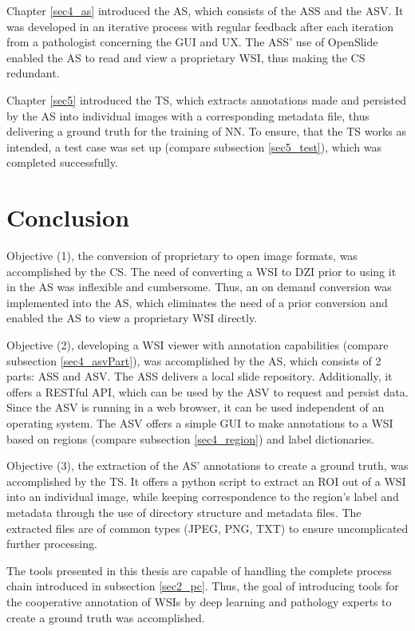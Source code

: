 Chapter \ref{sec4_as} introduced the AS, which consists of the ASS and the ASV. It was developed in an iterative process with regular feedback after each iteration from a pathologist concerning the GUI and UX. The ASS' use of OpenSlide enabled the AS to read and view a proprietary WSI, thus making the CS redundant.

Chapter \ref{sec5} introduced the TS, which extracts annotations made and persisted by the AS into individual images with a corresponding metadata file, thus delivering a ground truth for the training of NN. To ensure, that the TS works as intended, a test case was set up (compare subsection \ref{sec5_test}), which was completed successfully.


\section{Conclusion}

Objective (1), the conversion of proprietary to open image formats, was accomplished by the CS. The need of converting a WSI to DZI prior to using it in the AS was inflexible and cumbersome. Thus, an on demand conversion was implemented into the AS, which eliminates the need of a prior conversion and enabled the AS to view a proprietary WSI directly.
 
Objective (2), developing a WSI viewer with annotation capabilities (compare subsection \ref{sec4_asvPart}), was accomplished by the AS, which consists of 2 parts: ASS and ASV. The ASS delivers a local slide repository. Additionally, it offers a RESTful API, which can be used by the ASV to request and persist data. Since the ASV is running in a web browser, it can be used independent of an operating system. The ASV offers a simple GUI to make annotations to a WSI based on regions (compare subsection \ref{sec4_region}) and label dictionaries.

Objective (3), the extraction of the AS' annotations to create a ground truth, was accomplished by the TS. It offers a python script to extract an ROI out of a WSI into an individual image, while keeping correspondence to the region's label and metadata through the use of directory structure and metadata files. The extracted files are of common types (JPEG, PNG, TXT) to ensure uncomplicated further processing.

The tools presented in this thesis are capable of handling the complete process chain introduced in subsection \ref{sec2_pc}. Thus, the goal of introducing tools for the cooperative annotation of WSIs by deep learning and pathology experts to create a ground truth was accomplished.



